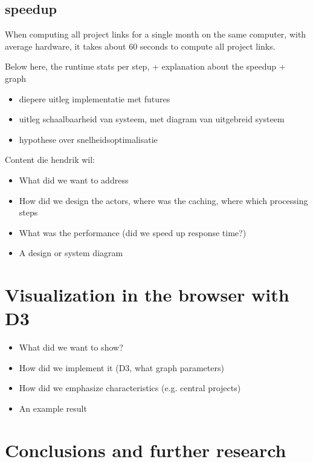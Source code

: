 \documentclass[10pt,a4paper]{article}
\begin{document}
\subsection{speedup}

When computing all project links for a single month on the same computer, with average hardware, it takes about 60 seconds to compute all project links. 

Below here, the runtime stats per step, + explanation about the speedup + graph



\begin{itemize}
	\item diepere uitleg implementatie met futures
	\item uitleg schaalbaarheid van systeem, met diagram van uitgebreid systeem
	\item hypothese over snelheidsoptimalisatie
\end{itemize}


Content die hendrik wil:

\begin{itemize}
    \item What did we want to address
    \item How did we design the actors, where was the caching, where which processing steps
    \item What was the performance (did we speed up response time?)
    \item A design or system diagram
\end{itemize}

\section{Visualization in the browser with D3}\label{sec:visualization}

\begin{itemize}
    \item What did we want to show?
    \item How did we implement it (D3, what graph parameters)
    \item How did we emphasize characteristics (e.g. central projects)
    \item An example result
\end{itemize}

\section{Conclusions and further research}\label{sec:conclusions}
\end{document}

